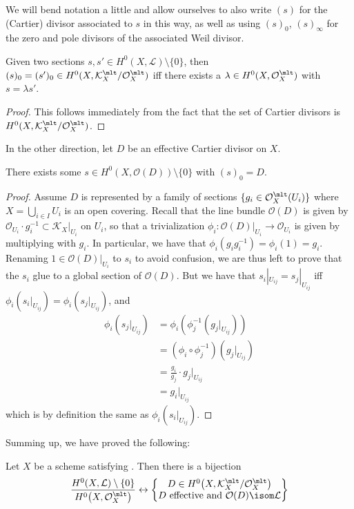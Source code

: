 \documentclass[wip, algebra]{bsteffan-lecturenotes}
\newcommand{\cO}{\mathcal{O}}
\newcommand{\cK}{\mathcal{K}}
\newcommand{\cL}{\mathcal{L}}
\begin{document}
We will bend notation a little and allow ourselves to also write $(s)$ for the (Cartier) divisor associated to $s$ in this way, as well as using $(s)_0$, $(s)_\infty$ for the zero and pole divisors of the associated Weil divisor.
\begin{proposition}
	Given two sections $s, s' \in H^0(X, \cL) \setminus \{0\}$, then $(s)_0 = (s')_0 \in H^0(X, \cK_X^\mlt / \cO_X^\mlt)$ iff there exists a $\lambda \in H^0(X, \cO_X^\mlt)$ with $s = \lambda s'$.
\end{proposition}
\begin{proof}
	This follows immediately from the fact that the set of Cartier divisors is $H^0(X, \cK_X^\mlt / \cO_X^\mlt)$.
\end{proof}
In the other direction, let $D$ be an effective Cartier divisor on $X$.
\begin{lemma}
	There exists some $s \in H^0(X, \cO(D)) \setminus \{0\}$ with $(s)_0 = D$.
\end{lemma}
\begin{proof}
	Assume $D$ is represented by a family of sections $\{g_i \in \cO_X^\mlt(U_i)\}$ where $X = \bigcup_{i \in I} U_i$ is an open covering.
	Recall that the line bundle $\cO(D)$ is given by $\cO_{U_i} \cdot g_i^{-1} \subset \cK_X|_{U_i}$ on $U_i$, so that a trivialization $\phi_i\colon \cO(D)|_{U_i} \to \cO_{U_i}$ is given by multiplying with $g_i$.
	In particular, we have that $\phi_i(g_i g_i^{-1}) = \phi_i(1) = g_i$.
	Renaming $1 \in \cO(D)|_{U_i}$ to $s_i$ to avoid confusion, we are thus left to prove that the $s_i$ glue to a global section of $\cO(D)$.
	But we have that $s_i|_{U_{ij}} = s_j|_{U_{ij}}$ iff $\phi_i(s_i|_{U_{ij}}) = \phi_i(s_j|_{U_{ij}})$, and 
	\begin{align*}
		\phi_i(s_j|_{U_{ij}}) &= \phi_i(\phi_j^{-1}(g_j|_{U_{ij}})) \\
							  &= (\phi_i \circ \phi_j^{-1})(g_j|_{U_{ij}}) \\
							  &= \frac{g_i}{g_j} \cdot g_j|_{U_{ij}} \\
							  &= g_i|_{U_{ij}}
	\end{align*}
	which is by definition the same as $\phi_i(s_i|_{U_{ij}})$.
\end{proof}
Summing up, we have proved the following:
\begin{proposition}\label{prp:div:linebundleeffectivedivisor}
	Let $X$ be a scheme satisfying .
	Then there is a bijection
	\begin{equation*}
		\frac{H^0(X, \cL) \setminus \{0\}}{H^0\big(X, \cO_X^\mlt\big)} \leftrightarrow 
		\begin{Bmatrix}
			D \in H^0\big(X, \cK_X^\mlt / \cO_X^\mlt\big) \\ 
			D \text{ effective and } \cO(D) \isom \cL
		\end{Bmatrix}
	\end{equation*}
\end{proposition}
\end{document}
